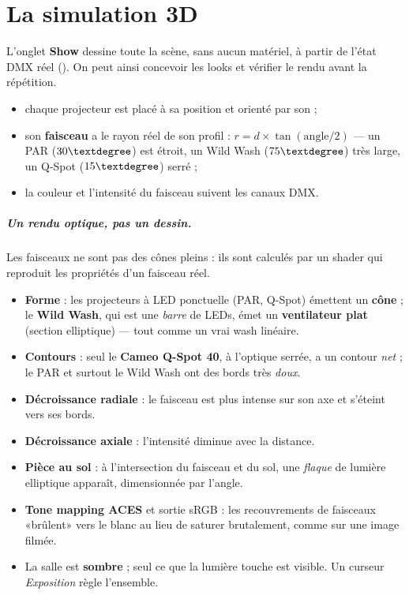 \chapter{La simulation 3D}
\label{ch:simulation}

L'onglet \textbf{Show} dessine toute la scène, sans aucun matériel, à partir de
l'état DMX réel (). On peut ainsi concevoir les looks
et vérifier le rendu avant la répétition.

\begin{itemize}[leftmargin=1.4em]
  \item chaque projecteur est placé à sa position  et orienté par
        son  ;
  \item son \textbf{faisceau} a le rayon réel de son profil :
        $r = d \times \tan(\text{angle}/2)$ --- un PAR ($30\textdegree$) est
        étroit, un Wild Wash ($75\textdegree$) très large, un Q-Spot
        ($15\textdegree$) serré ;
  \item la couleur et l'intensité du faisceau suivent les canaux DMX.
\end{itemize}

\paragraph{Un rendu optique, pas un dessin.} Les faisceaux ne sont pas des cônes
pleins : ils sont calculés par un shader qui reproduit les propriétés d'un
faisceau réel.

\begin{itemize}[leftmargin=1.4em]
  \item \textbf{Forme} : les projecteurs à LED ponctuelle (PAR, Q-Spot) émettent
        un \textbf{cône} ; le \textbf{Wild Wash}, qui est une \emph{barre} de
        LEDs, émet un \textbf{ventilateur plat} (section elliptique) --- tout
        comme un vrai wash linéaire.
  \item \textbf{Contours} : seul le \textbf{Cameo Q-Spot 40}, à l'optique
        serrée, a un contour \emph{net} ; le PAR et surtout le Wild Wash ont des
        bords très \emph{doux}.
  \item \textbf{Décroissance radiale} : le faisceau est plus intense sur son axe
        et s'éteint vers ses bords.
  \item \textbf{Décroissance axiale} : l'intensité diminue avec la distance.
  \item \textbf{Pièce au sol} : à l'intersection du faisceau et du sol, une
        \emph{flaque} de lumière elliptique apparaît, dimensionnée par l'angle.
  \item \textbf{Tone mapping ACES} et sortie sRGB : les recouvrements de
        faisceaux «{}brûlent{}» vers le blanc au lieu de saturer brutalement,
        comme sur une image filmée.
  \item La salle est \textbf{sombre} ; seul ce que la lumière touche est visible.
        Un curseur \emph{Exposition} règle l'ensemble.
\end{itemize}

